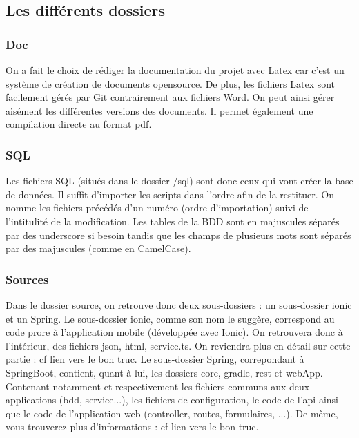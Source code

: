 		\subsection{Les différents dossiers}
			\subsubsection{Doc}
				On a fait le choix de rédiger la documentation du projet avec Latex car c'est un système de création de documents opensource. De plus, les fichiers Latex sont facilement gérés par Git contrairement aux fichiers Word. On peut ainsi gérer aisément les différentes versions des documents. Il permet également une compilation directe au format pdf.

			\subsubsection{SQL}
				Les fichiers SQL (situés dans le dossier /sql) sont donc ceux qui vont créer la base de données. Il suffit d'importer les scripts dans l'ordre afin de la restituer. On nomme les fichiers précédés d'un numéro (ordre d'importation) suivi de l'intitulité de la modification. Les tables de la BDD sont en majuscules séparés par des underscore si besoin tandis que les champs de plusieurs mots sont séparés par des majuscules (comme en CamelCase).

			\subsubsection{Sources}
				Dans le dossier source, on retrouve donc deux sous-dossiers : un sous-dossier ionic et un Spring.
				Le sous-dossier ionic, comme son nom le suggère, correspond au code prore à l'application mobile (développée avec Ionic). On retrouvera donc à l'intérieur, des fichiers json, html, service.ts. On reviendra plus en détail sur cette partie : cf lien vers le bon truc. 	%
				Le sous-dossier Spring, correpondant à SpringBoot, contient, quant à lui, les dossiers core, gradle, rest et webApp. Contenant notamment et respectivement les fichiers communs aux deux applications (bdd, service...), les fichiers de configuration, le code de l'api ainsi que le code de l'application web (controller, routes, formulaires, ...).
				De même, vous trouverez plus d'informations : cf lien vers le bon truc. %

